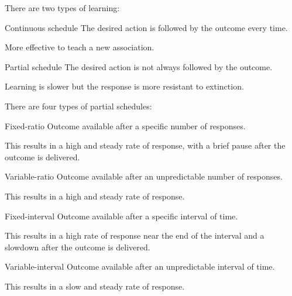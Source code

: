 There are two types of learning:
\begin{descriptionlist}
    \item[Continuous schedule] 
        The desired action is followed by the outcome every time.
        \begin{remark}
            More effective to teach a new association.
        \end{remark}

    \item[Partial schedule] 
        The desired action is not always followed by the outcome.
        \begin{remark}
            Learning is slower but the response is more resistant to extinction.
        \end{remark}

        There are four types of partial schedules:
        \begin{descriptionlist}
            \item[Fixed-ratio] 
                Outcome available after a specific number of responses.

                This results in a high and steady rate of response, with a brief pause after the outcome is delivered.


            \item[Variable-ratio] 
                Outcome available after an unpredictable number of responses.

                This results in a high and steady rate of response.


            \item[Fixed-interval] 
                Outcome available after a specific interval of time.

                This results in a high rate of response near the end of the interval and a slowdown after the outcome is delivered.


            \item[Variable-interval] 
                Outcome available after an unpredictable interval of time.

                This results in a slow and steady rate of response.
        \end{descriptionlist}
\end{descriptionlist}

